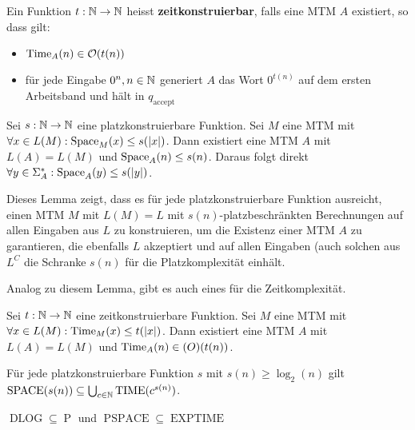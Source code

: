 \begin{definition}
Ein Funktion \(t: \mathbb{N} \to \mathbb{N}\) heisst \textbf{zeitkonstruierbar}, falls eine MTM \(A\) existiert, so dass gilt:
\begin{itemize}
  \item \( \operatorname{Time}_A(n) \in \mathcal{O}(t(n))\)
  \item für jede Eingabe \(0^n, n \in \mathbb{N}\) generiert \(A\) das Wort \(0^{t(n)}\) auf dem ersten Arbeitsband und hält in \(q_\text{accept}\)\\
\end{itemize}
\end{definition}

\begin{lemma}
Sei \(s: \mathbb{N} \to \mathbb{N}\) eine platzkonstruierbare Funktion. Sei \(M\) eine MTM mit \(\forall x \in L(M): \operatorname{Space}_M(x) \leq s(|x|)\). Dann existiert eine MTM \(A\) mit \(L(A) = L(M)\) und \(\operatorname{Space}_A(n) \leq s(n)\). Daraus folgt direkt \(\forall y \in \Sigma_A^*: \operatorname{Space}_A(y) \leq s(|y|)\).\\
\end{lemma}

Dieses Lemma zeigt, dass es für jede platzkonstruierbare Funktion ausreicht, einen MTM \(M\) mit \(L(M) = L\) mit \(s(n)\)-platzbeschränkten Berechnungen auf allen Eingaben aus \(L\) zu konstruieren, um die Existenz einer MTM \(A\) zu garantieren, die ebenfalls \(L\) akzeptiert und auf allen Eingaben (auch solchen aus \(L^C\) die Schranke \(s(n)\) für die Platzkomplexität einhält.

Analog zu diesem Lemma, gibt es auch eines für die Zeitkomplexität.\\

\begin{lemma}
Sei \(t: \mathbb{N} \to \mathbb{N}\) eine zeitkonstruierbare Funktion. Sei \(M\) eine MTM mit \(\forall x \in L(M): \operatorname{Time}_M(x) \leq t(|x|)\). Dann existiert eine MTM \(A\) mit \(L(A) = L(M)\) und \(\operatorname{Time}_A(n) \in \mathcal(O)(t(n))\).\\
\end{lemma}

\begin{satz}
Für jede platzkonstruierbare Funktion \(s\) mit \(s(n) \geq \log_2(n)\) gilt \(\operatorname{SPACE}(s(n)) \subseteq \bigcup_{c \in \mathbb{N}} \operatorname{TIME}(c^{s(n)})\).\\
\end{satz}

\begin{corollary}
\(\operatorname{DLOG} \subseteq \operatorname{P}\) und \(\operatorname{PSPACE} \subseteq \operatorname{EXPTIME}\)\\
\end{corollary}

